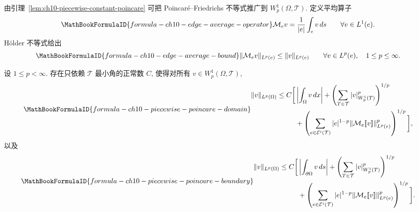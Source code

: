 由引理~\ref{lem:ch10-piecewise-constant-poincare} 可把 Poincaré--Friedrichs 不等式推广到 $W_p^1(\Omega,\mathcal T)$. 定义平均算子
\[
\MathBookFormulaID{formula-ch10-edge-average-operator}
\mathcal M_ev=\frac1{|e|}\int_ev\,ds
\qquad\forall v\in L^1(e).
\]
Hölder 不等式给出
\begin{equation}
\MathBookFormulaID{formula-ch10-edge-average-bound}
\label{eq:ch10-edge-average-bound}
\|\mathcal M_ev\|_{L^p(e)}\leq\|v\|_{L^p(e)}
\qquad\forall v\in L^p(e),\quad1\leq p\leq\infty.
\end{equation}

\begin{Theorem}
\label{thm:ch10-piecewise-poincare}
设 $1\leq p<\infty$. 存在只依赖 $\mathcal T$ 最小角的正常数 $C$, 使得对所有 $v\in W_p^1(\Omega,\mathcal T)$,
\begin{equation}
\MathBookFormulaID{formula-ch10-piecewise-poincare-domain}
\label{eq:ch10-piecewise-poincare-domain}
\begin{split}
\|v\|_{L^p(\Omega)}\leq C\bigg[&\left|\int_\Omega v\,dx\right|
+\left(\sum_{T\in\mathcal T}|v|_{W_p^1(T)}^p\right)^{1/p}\\
&+\left(\sum_{e\in\mathcal E^i(\mathcal T)}|e|^{1-p}
\|\mathcal M_e[\![v]\!]\|_{L^p(e)}^p\right)^{1/p}\bigg],
\end{split}
\end{equation}
以及
\begin{equation}
\MathBookFormulaID{formula-ch10-piecewise-poincare-boundary}
\label{eq:ch10-piecewise-poincare-boundary}
\begin{split}
\|v\|_{L^p(\Omega)}\leq C\bigg[&\left|\int_{\partial\Omega}v\,ds\right|
+\left(\sum_{T\in\mathcal T}|v|_{W_p^1(T)}^p\right)^{1/p}\\
&+\left(\sum_{e\in\mathcal E^i(\mathcal T)}|e|^{1-p}
\|\mathcal M_e[\![v]\!]\|_{L^p(e)}^p\right)^{1/p}\bigg].
\end{split}
\end{equation}
\end{Theorem}

